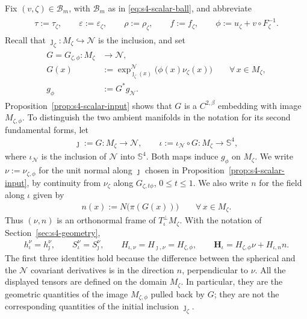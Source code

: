 \documentclass[a4paper,11pt,oneside,reqno]{amsart}
\numberwithin{equation}{section}
\theoremstyle{definition}
\begin{document}
Fix $(v,\zeta)\in\mathcal B_m$, with $\mathcal B_m$ as in
\eqref{eq:s4-scalar-ball}, and abbreviate
%
\begin{align}
    \label{eq:s4-transverse-abbreviations}
    \begin{split}
        \tau:=\tau_\zeta,\qquad
        \varepsilon:=\varepsilon_\zeta,\qquad
        \rho:=\rho_\zeta,\qquad f:=f_\zeta,\qquad\phi:=u_\zeta+v\circ F_\zeta^{-1}.
    \end{split}
\end{align}
%
Recall that $\jmath_\zeta:M_\zeta\hookrightarrow\mathcal N$
is the inclusion, and set
%
\begin{align}
    \label{eq:s4-scalar-graph-map}
    \begin{split}
        G=G_{\zeta,\phi}:M_\zeta&\rightarrow\mathcal N,\\
        G(x)&:=\exp_{\jmath_\zeta(x)}^{\mathcal N}
            \bigl(\phi(x)\nu_\zeta(x)\bigr)
            \qquad\forall\,x\in M_\zeta,\\
        g_\phi&:=G^*g_{\mathcal N}.
    \end{split}
\end{align}
%
Proposition~\ref{prop:s4-scalar-input} shows that $G$ is a
$C^{2,\beta}$ embedding with image $M_{\zeta,\phi}$.
To distinguish the two ambient manifolds in the notation
for its second fundamental forms, let
%
\begin{align*}
    \jmath:=G:M_\zeta\rightarrow\mathcal N,
    \qquad
    \iota:=\iota_{\mathcal N}\circ G:
        M_\zeta\rightarrow\mathbb S^4,
\end{align*}
%
where $\iota_{\mathcal N}$ is the inclusion of $\mathcal N$
into $\mathbb S^4$. Both maps induce $g_\phi$ on $M_\zeta$.
We write $\nu:=\nu_{\zeta,\phi}$ for the unit normal along
$\jmath$ chosen in Proposition~\ref{prop:s4-scalar-input},
by continuity from $\nu_\zeta$ along $G_{\zeta,t\phi}$,
$0\leq t\leq1$. We also write $n$ for the field along
$\iota$ given by
%
\begin{align*}
    n(x):=N\bigl(\pi(G(x))\bigr)
    \qquad\forall\,x\in M_\zeta.
\end{align*}
%
Thus $(\nu,n)$ is an orthonormal frame of
$T^\perp_\iota M_\zeta$. With the notation of
Section~\ref{sec:s4-geometry},
%
\begin{align*}
    h_\iota^\nu=h_\jmath^\nu,\qquad
    S_\iota^\nu=S_\jmath^\nu,\qquad
    H_{\iota,\nu}=H_{\jmath,\nu}=H_{\zeta,\phi},\qquad\mathbf H_\iota
      =H_{\zeta,\phi}\nu+H_{\iota,n}n.
\end{align*}
%
The first three identities hold because the difference
between the spherical and the $\mathcal N$ covariant
derivatives is in the direction $n$, perpendicular to
$\nu$. All the displayed tensors are defined on the
domain $M_\zeta$. In particular, they are the geometric
quantities of the image $M_{\zeta,\phi}$ pulled back by $G$;
they are not the corresponding quantities of the initial
inclusion $\jmath_\zeta$.
\end{document}
